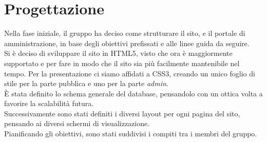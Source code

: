 \section{Progettazione}
Nella fase iniziale, il gruppo ha deciso come strutturare il sito, e il portale di amministrazione, in base degli obiettivi prefissati e alle linee guida da seguire.\\
Si è deciso di sviluppare il sito in HTML5, visto che ora è maggiormente supportato e per fare in modo che il sito sia più facilmente mantenibile nel tempo. Per la presentazione ci siamo affidati a CSS3, creando un unico foglio di stile per la parte pubblica e uno per la parte \textit{admin}.\\
È stata definito lo schema generale del database, pensandolo con un ottica volta a favorire la scalabilità futura. \\
Successivamente sono stati definiti i diversi layout per ogni pagina del sito, pensando ai diversi schermi di visualizzazione.\\Pianificando gli obiettivi, sono stati suddivisi i compiti tra i membri del gruppo.

